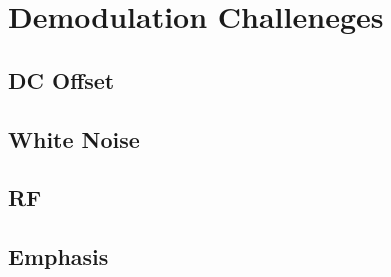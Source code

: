 \chapter{Demodulation Challeneges}

\section{DC Offset}

\section{White Noise}

\section{RF}

\section{Emphasis}
